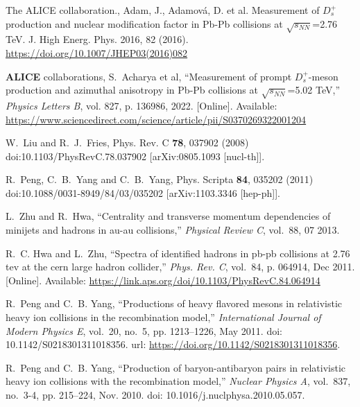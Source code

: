 \documentclass[twocolumn,aps,superscriptaddress,nofootinbib,floatfix]{revtex4}
\begin{document}
\begin{thebibliography}{99}
The ALICE collaboration., Adam, J., Adamová, D. et al. Measurement of $D^+_s$
production and nuclear modification factor in Pb-Pb collisions at $\sqrt{s_{NN}}$=2.76 TeV. J. High Energ. Phys. 2016, 82 (2016). 
\url{https://doi.org/10.1007/JHEP03(2016)082}

\textbf{ALICE} collaborations, S.~Acharya et al, ``Measurement of prompt $D_s^+$-meson
production and azimuthal anisotropy in Pb-Pb collisions at $\sqrt{s_{NN}}$=5.02 TeV,''
\emph{Physics Letters B}, vol. 827, p. 136986, 2022. [Online]. Available:
\url{https://www.sciencedirect.com/science/article/pii/S0370269322001204}

W.~Liu and R.~J.~Fries,
Phys. Rev. C \textbf{78}, 037902 (2008)
doi:10.1103/PhysRevC.78.037902
[arXiv:0805.1093 [nucl-th]].

R.~Peng, C.~B.~Yang and C.~B.~Yang,
Phys. Scripta \textbf{84}, 035202 (2011)
doi:10.1088/0031-8949/84/03/035202
[arXiv:1103.3346 [hep-ph]].

L.~Zhu and R.~Hwa, ``Centrality and transverse momentum dependencies of
minijets and hadrons in au-au collisions,'' \emph{Physical Review C},
vol.~88, 07 2013.

R.~C. Hwa and L.~Zhu, ``Spectra of identified hadrons in pb-pb collisions at
2.76 tev at the cern large hadron collider,'' \emph{Phys. Rev. C}, vol.~84,
p. 064914, Dec 2011. [Online]. Available:
\url{https://link.aps.org/doi/10.1103/PhysRevC.84.064914}

R.~Peng and C.~B. Yang, ``Productions of heavy flavored mesons in relativistic heavy ion collisions in the recombination model,'' \emph{International Journal of Modern Physics E}, vol.~20, no.~5, pp. 1213--1226, May 2011. doi: 10.1142/S0218301311018356. url: \url{https://doi.org/10.1142/S0218301311018356}.

R.~Peng and C.~B. Yang, ``Production of baryon-antibaryon pairs in relativistic heavy ion collisions with the recombination model,'' \emph{Nuclear Physics A}, vol.~837, no.~3-4, pp. 215--224, Nov. 2010. doi: 10.1016/j.nuclphysa.2010.05.057.

\end{thebibliography}
\end{document}
